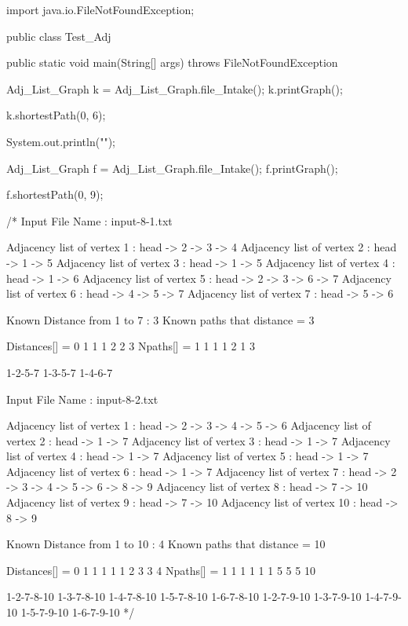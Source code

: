 import java.io.FileNotFoundException;

public class Test_Adj {

   public static void main(String[] args) throws FileNotFoundException {

      Adj_List_Graph k = Adj_List_Graph.file_Intake();
      k.printGraph();

      k.shortestPath(0, 6);

      System.out.println("");

      Adj_List_Graph f = Adj_List_Graph.file_Intake();
      f.printGraph();

      f.shortestPath(0, 9);

   }
      /*
   Input File Name : input-8-1.txt

   Adjacency list of vertex 1  :  head -> 2 -> 3 -> 4
   Adjacency list of vertex 2  :  head -> 1 -> 5
   Adjacency list of vertex 3  :  head -> 1 -> 5
   Adjacency list of vertex 4  :  head -> 1 -> 6
   Adjacency list of vertex 5  :  head -> 2 -> 3 -> 6 -> 7
   Adjacency list of vertex 6  :  head -> 4 -> 5 -> 7
   Adjacency list of vertex 7  :  head -> 5 -> 6

   Known Distance from 1 to 7 : 3
   Known paths that distance = 3

   Distances[] = 0 1 1 1 2 2 3 
   Npaths[] = 1 1 1 1 2 1 3 

   1-2-5-7
   1-3-5-7
   1-4-6-7

   Input File Name : input-8-2.txt

   Adjacency list of vertex 1  :  head -> 2 -> 3 -> 4 -> 5 -> 6
   Adjacency list of vertex 2  :  head -> 1 -> 7
   Adjacency list of vertex 3  :  head -> 1 -> 7
   Adjacency list of vertex 4  :  head -> 1 -> 7
   Adjacency list of vertex 5  :  head -> 1 -> 7
   Adjacency list of vertex 6  :  head -> 1 -> 7
   Adjacency list of vertex 7  :  head -> 2 -> 3 -> 4 -> 5 -> 6 -> 8 -> 9
   Adjacency list of vertex 8  :  head -> 7 -> 10
   Adjacency list of vertex 9  :  head -> 7 -> 10
   Adjacency list of vertex 10  :  head -> 8 -> 9

   Known Distance from 1 to 10 : 4
   Known paths that distance = 10

   Distances[] = 0 1 1 1 1 1 2 3 3 4
   Npaths[] = 1 1 1 1 1 1 5 5 5 10

   1-2-7-8-10
   1-3-7-8-10
   1-4-7-8-10
   1-5-7-8-10
   1-6-7-8-10
   1-2-7-9-10
   1-3-7-9-10
   1-4-7-9-10
   1-5-7-9-10
   1-6-7-9-10
    */
}
